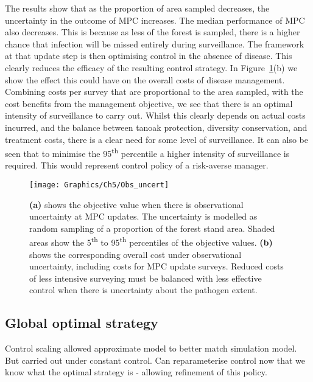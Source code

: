 The results show that as the proportion of area sampled decreases, the uncertainty in the outcome of MPC increases. The median performance of MPC also decreases. This is because as less of the forest is sampled, there is a higher chance that infection will be missed entirely during surveillance. The framework at that update step is then optimising control in the absence of disease. This clearly reduces the efficacy of the resulting control strategy. In Figure~\ref{fig:ch5:obs_uncert}(b) we show the effect this could have on the overall costs of disease management. Combining costs per survey that are proportional to the area sampled, with the cost benefits from the management objective, we see that there is an optimal intensity of surveillance to carry out. Whilst this clearly depends on actual costs incurred, and the balance between tanoak protection, diversity conservation, and treatment costs, there is a clear need for some level of surveillance. It can also be seen that to minimise the 95\textsuperscript{th} percentile a higher intensity of surveillance is required. This would represent control policy of a risk-averse manager.

\begin{figure}
    \begin{center}
        \texttt{[image: Graphics/Ch5/Obs\_uncert]}
        \caption[Performance of MPC under observational uncertainty]{\textbf{(a)} shows the objective value when there is observational uncertainty at MPC updates. The uncertainty is modelled as random sampling of a proportion of the forest stand area. Shaded areas show the 5\textsuperscript{th} to 95\textsuperscript{th} percentiles of the objective values. \textbf{(b)} shows the corresponding overall cost under observational uncertainty, including costs for MPC update surveys. Reduced costs of less intensive surveying must be balanced with less effective control when there is uncertainty about the pathogen extent. \label{fig:ch5:obs_uncert}}
    \end{center}
\end{figure}

\subsection{Global optimal strategy}


Control scaling allowed approximate model to better match simulation model. But carried out under constant control. Can reparameterise control now that we know what the optimal strategy is - allowing refinement of this policy.

